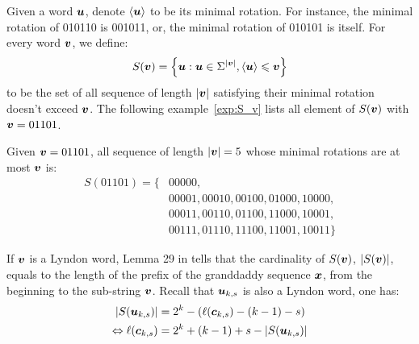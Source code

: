 Given a word ${\boldsymbol u}$, denote $\langle {\boldsymbol u}\rangle$ to be its minimal rotation. For instance, the minimal rotation of 010110 is 001011, or, the minimal rotation of 010101 is itself. For every word ${\boldsymbol v}$, we define:
\begin{align*}
    S({\boldsymbol v}) = \left\{{\boldsymbol u}: {\boldsymbol u}\in\Sigma^{\left \lvert  {\boldsymbol v} \right \rvert},\langle {\boldsymbol u}\rangle\leqslant {\boldsymbol v}\right\}
\end{align*}
to be the set of all sequence of length $\left \lvert  {\boldsymbol v} \right \rvert$ satisfying their minimal rotation doesn't exceed ${\boldsymbol v}$. The following example~\ref{exp:S_v} lists all element of $S({\boldsymbol v})$ with ${\boldsymbol v}=01101$.
\begin{example}\label{exp:S_v}
    Given ${\boldsymbol v}= 01101$, all sequence of length $\left \lvert {\boldsymbol v} \right \rvert=5$ whose minimal rotations are at most ${\boldsymbol v}$ is:
    \begin{align*}
        S(01101) = \bigl\{ &00000,\\
        &00001,00010,00100,01000,10000, \\
        &00011,00110,01100,11000,10001, \\
        &00111,01110,11100,11001,10011 \bigl\}
    \end{align*}
\end{example}
If ${\boldsymbol v}$ is a Lyndon word, Lemma 29 in \cite{kociumaka2016efficient} tells that the cardinality of $S({\boldsymbol v})$, $\left \lvert  S({\boldsymbol v}) \right \rvert$, equals to the length of the prefix of the granddaddy sequence ${\boldsymbol x}$, from the beginning to the sub-string ${\boldsymbol v}$. Recall that ${\boldsymbol u}_{k,s}$ is also a Lyndon word, one has:
\begin{align}
    \left \lvert  S({\boldsymbol u}_{k,s}) \right \rvert &= 2^{k}- (\ell({\boldsymbol c}_{k,s}) - (k-1) -s ) \nonumber\\
    \Leftrightarrow  \ell({\boldsymbol c}_{k,s}) &= 2^{k}+(k-1)+s-\left \lvert  S({\boldsymbol u}_{k,s}) \right \rvert \label{eq:cks&sks}
\end{align}

